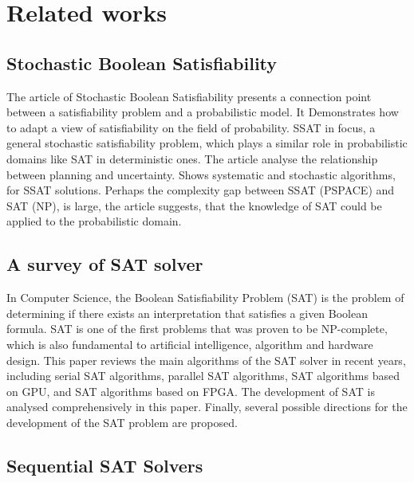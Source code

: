 \documentclass{article}
\begin{document}
\section{Related works}
\label{sec:relwork}

\subsection{Stochastic Boolean Satisfiability \cite{sbs}}

The article of Stochastic Boolean Satisfiability presents a connection point between a satisfiability problem and a probabilistic model. It Demonstrates how to adapt a view of satisfiability on the field of probability. SSAT in focus, a general stochastic satisfiability problem, which plays a similar role in probabilistic domains like SAT in deterministic ones. The article analyse the relationship between planning and uncertainty. Shows systematic and stochastic algorithms, for SSAT solutions. Perhaps the complexity gap between SSAT (PSPACE) and SAT (NP), is large, the article suggests, that the knowledge of SAT could be applied to the probabilistic domain.

\subsection{A survey of SAT solver \cite{surveyOfSatSolvers}}

In Computer Science, the Boolean Satisfiability Problem (SAT) is the problem of determining if there exists an interpretation that satisfies a given Boolean formula. SAT is one of the first problems that was proven to be NP-complete, which is also fundamental to artificial intelligence, algorithm and hardware design. This paper reviews the main algorithms of the SAT solver in recent years, including serial SAT algorithms, parallel SAT algorithms, SAT algorithms based on GPU, and SAT algorithms based on FPGA. The development of SAT is analysed comprehensively in this paper. Finally, several possible directions for the development of the SAT problem are proposed.

\subsection{Sequential SAT Solvers}
\end{document}
